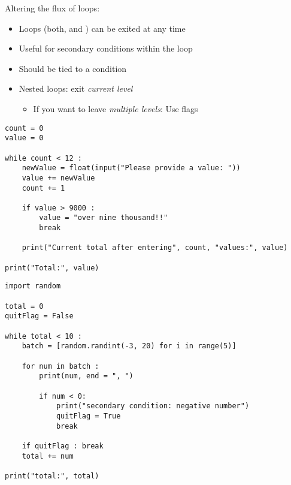 \begin{frame}[fragile]{Altering the flux of loops: }
%
\begin{itemize}
\item Loops (\ie both,  and ) can be exited at any time
\item Useful for secondary conditions within the loop
\item Should be tied to a condition\\
 \Thus {}
\item Nested loops: exit \emph{current level}
	\begin{itemize}
	\item If you want to leave \emph{multiple levels}: Use flags
	\end{itemize}
\end{itemize}
%
\end{frame}


\begin{frame}[fragile]
\begin{codebox}
\begin{verbatim}
count = 0
value = 0

while count < 12 :
    newValue = float(input("Please provide a value: "))
    value += newValue
    count += 1
  
    if value > 9000 :
        value = "over nine thousand!!"
        break
  
    print("Current total after entering", count, "values:", value)

print("Total:", value)
\end{verbatim}
\end{codebox}
\end{frame}


\begin{frame}[fragile]
\begin{codebox}
\begin{verbatim}
import random

total = 0
quitFlag = False

while total < 10 :
    batch = [random.randint(-3, 20) for i in range(5)]
    
    for num in batch :
        print(num, end = ", ")

        if num < 0:
            print("secondary condition: negative number")
            quitFlag = True
            break
            
    if quitFlag : break
    total += num
    
print("total:", total)
\end{verbatim}
\end{codebox}
\end{frame}

